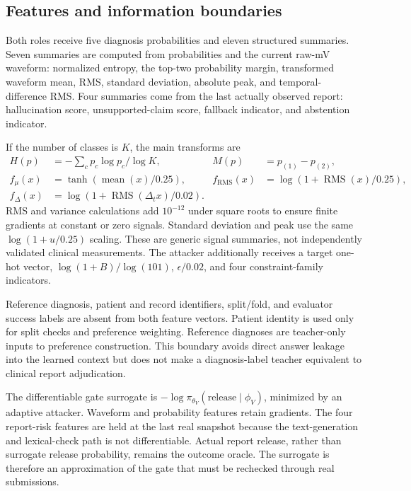 \subsection{Features and information boundaries}
Both roles receive five diagnosis probabilities and eleven structured summaries. Seven summaries are computed from probabilities and the current raw-mV waveform: normalized entropy, the top-two probability margin, transformed waveform mean, RMS, standard deviation, absolute peak, and temporal-difference RMS. Four summaries come from the last actually observed report: hallucination score, unsupported-claim score, fallback indicator, and abstention indicator.

If the number of classes is $K$, the main transforms are
\begin{align}
 H(p)&=-\sum_c p_c\log p_c/\log K, & M(p)&=p_{(1)}-p_{(2)},\\
 f_{\mu}(x)&=\tanh(\operatorname{mean}(x)/0.25), &
 f_{\mathrm{RMS}}(x)&=\log(1+\operatorname{RMS}(x)/0.25),\\
 f_{\Delta}(x)&=\log(1+\operatorname{RMS}(\Delta_t x)/0.02).
\end{align}
RMS and variance calculations add $10^{-12}$ under square roots to ensure finite gradients at constant or zero signals. Standard deviation and peak use the same $\log(1+u/0.25)$ scaling. These are generic signal summaries, not independently validated clinical measurements. The attacker additionally receives a target one-hot vector, $\log(1+B)/\log(101)$, $\epsilon/0.02$, and four constraint-family indicators.

Reference diagnosis, patient and record identifiers, split/fold, and evaluator success labels are absent from both feature vectors. Patient identity is used only for split checks and preference weighting. Reference diagnoses are teacher-only inputs to preference construction. This boundary avoids direct answer leakage into the learned context but does not make a diagnosis-label teacher equivalent to clinical report adjudication.

The differentiable gate surrogate is $-\log\pi_{\theta_V}(\mathrm{release}\mid\phi_V)$, minimized by an adaptive attacker. Waveform and probability features retain gradients. The four report-risk features are held at the last real snapshot because the text-generation and lexical-check path is not differentiable. Actual report release, rather than surrogate release probability, remains the outcome oracle. The surrogate is therefore an approximation of the gate that must be rechecked through real submissions.

